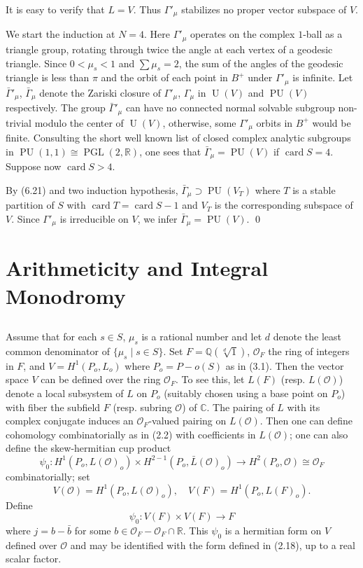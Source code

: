 \documentclass[12pt,a4paper]{article}
\theoremstyle{plain}
\theoremstyle{definition}
\theoremstyle{remark}
\DeclareMathOperator{\card}{card}
\DeclareMathOperator{\PGL}{PGL}
\DeclareMathOperator{\PU}{PU}
\DeclareMathOperator{\U}{U}
\begin{document}
It is easy to verify that $L = V$. Thus $\Gamma'_\mu$ stabilizes no proper vector subspace of $V$.

We start the induction at $N = 4$. Here $\Gamma'_\mu$ operates on the complex $1$-ball as a triangle group, rotating through twice the angle at each vertex of a geodesic triangle. Since $0 < \mu_s < 1$ and $\sum \mu_s = 2$, the sum of the angles of the geodesic triangle is less than $\pi$ and the orbit of each point in $B^+$ under $\Gamma'_\mu$ is infinite. Let $\bar{\Gamma}'_\mu$, $\bar{\Gamma}_\mu$ denote the Zariski closure of $\Gamma'_\mu$, $\Gamma_\mu$ in $\U(V)$ and $\PU(V)$ respectively. The group $\bar{\Gamma}'_\mu$ can have no connected normal solvable subgroup non-trivial modulo the center of $\U(V)$, otherwise, some $\Gamma'_\mu$ orbits in $B^+$ would be finite. Consulting the short well known list of closed complex analytic subgroups in $\PU(1, 1) \cong \PGL(2, \mathbb{R})$, one sees that $\bar{\Gamma}_\mu = \PU(V)$ if $\card S = 4$. Suppose now $\card S > 4$.

By (6.21) and two induction hypothesis, $\bar{\Gamma}_\mu \supset \PU(V_T)$ where $T$ is a stable partition of $S$ with $\card T = \card S - 1$ and $V_T$ is the corresponding subspace of $V$. Since $\Gamma'_\mu$ is irreducible on $V$, we infer $\bar{\Gamma}_\mu = \PU(V)$.
\qed

\section{Arithmeticity and Integral Monodromy}
\label{sec:12}

\subsection{}
\label{12.1}

Assume that for each $s \in S$, $\mu_s$ is a rational number and let $d$ denote the least common denominator of $\{\mu_s \mid s \in S\}$. Set $F = \mathbb{Q}(\sqrt[d]{1})$, $\mathcal{O}_F$ the ring of integers in $F$, and $V = H^1(P_o, L_o)$ where $P_o = P - o(S)$ as in (3.1). Then the vector space $V$ can be defined over the ring $\mathcal{O}_F$. To see this, let $L(F)$ (resp. $L(\mathcal{O})$) denote a local subsystem of $L$ on $P_o$ (suitably chosen using a base point on $P_o$) with fiber the subfield $F$ (resp. subring $\mathcal{O}$) of $\mathbb{C}$. The pairing of $L$ with its complex conjugate induces an $\mathcal{O}_F$-valued pairing on $L(\mathcal{O})$. Then one can define cohomology combinatorially as in (2.2) with coefficients in $L(\mathcal{O})$; one can also define the skew-hermitian cup product
\[
\psi_0 : H^1(P_o, L(\mathcal{O})_o) \times H^{2-1}(P_o, \bar{L}(\mathcal{O})_o) \to H^2(P_o, \mathcal{O}) \cong \mathcal{O}_F
\]
combinatorially; set
\[
V(\mathcal{O}) = H^1(P_o, L(\mathcal{O})_o), \quad V(F) = H^1(P_o, L(F)_o).
\]
Define
\begin{equation}
\label{12.1.1}
\psi_0 : V(F) \times V(F) \to F
\end{equation}
where $j = b - \bar{b}$ for some $b \in \mathcal{O}_F - \mathcal{O}_F \cap \mathbb{R}$. This $\psi_0$ is a hermitian form on $V$ defined over $\mathcal{O}$ and may be identified with the form defined in (2.18), up to a real scalar factor.
\end{document}
